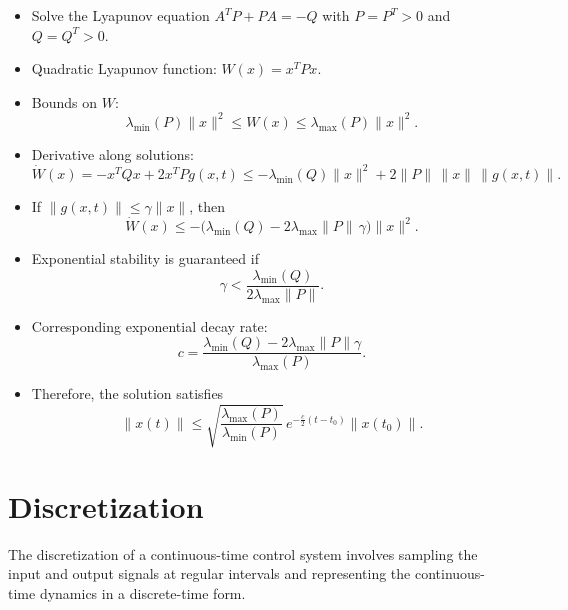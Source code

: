 \begin{itemize}
    \item Solve the Lyapunov equation \(A^T P + P A = -Q\) with \(P=P^T>0\) and \(Q=Q^T>0\).  
    \item Quadratic Lyapunov function: \(W(x) = x^T P x\).  
    \item Bounds on \(W\):
    \begin{equation}
    \lambda_{\min}(P)\|x\|^2 \le W(x) \le \lambda_{\max}(P)\|x\|^2.
    \end{equation}
    \item Derivative along solutions:
    \begin{equation}
    \dot W(x) = -x^T Q x + 2 x^T P g(x,t) \le -\lambda_{\min}(Q)\|x\|^2 + 2\|P\|\,\|x\|\,\|g(x,t)\|.
    \end{equation}
    \item If \(\|g(x,t)\| \le \gamma \|x\|\), then
    \begin{equation}
    \dot W(x) \le -\big(\lambda_{\min}(Q) - 2 \lambda_{\max}\|P\|\, \gamma \big) \|x\|^2.
    \end{equation}
    \item Exponential stability is guaranteed if
    \begin{equation}
    \gamma < \frac{\lambda_{\min}(Q)}{2 \lambda_{\max}\|P\|}.
    \end{equation}
    \item Corresponding exponential decay rate:
    \begin{equation}
    c = \frac{\lambda_{\min}(Q) - 2 \lambda_{\max}\|P\| \gamma}{\lambda_{\max}(P)}.
    \end{equation}
    \item Therefore, the solution satisfies
    \begin{equation}
    \|x(t)\| \le \sqrt{\frac{\lambda_{\max}(P)}{\lambda_{\min}(P)}} 
    \, e^{-\tfrac{c}{2}(t-t_0)} \|x(t_0)\|.
    \end{equation}
\end{itemize}

\section{Discretization}

The discretization of a continuous-time control system involves sampling the input and output signals at regular intervals and representing the continuous-time dynamics in a discrete-time form.

